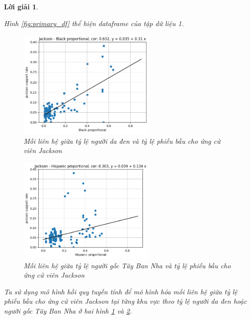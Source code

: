 \documentclass[14pt, a4paper]{article}
\theoremstyle{sltheorem}
\theoremstyle{soltheorem}
\newtheorem*{loigiai}{Lời giải}
\begin{document}
\begin{loigiai}
\begin{enumerate}
    Hình \ref{fig:primary_df} thể hiện dataframe của tập dữ liệu 1.

    \begin{figure}[H]
        \centering
        \includegraphics[width=0.6\textwidth]{figures/Jackson_support_rate-Black_proportional-Dataset_1.png}
        \caption{Mối liên hệ giữa tỷ lệ người da đen và tỷ lệ phiếu bầu cho ứng cử viên Jackson}
        \label{fig:Jackson_support_rate_Black_proportional_Dataset_1}
    \end{figure}

    \begin{figure}[H]
        \centering
        \includegraphics[width=0.6\textwidth]{figures/Jackson_support_rate-Hispanic_proportional-Dataset_1.png}
        \caption{Mối liên hệ giữa tỷ lệ người gốc Tây Ban Nha và tỷ lệ phiếu bầu cho ứng cử viên Jackson}
        \label{fig:Jackson_support_rate_Hispanic_proportional_Dataset_1}
    \end{figure}

    Ta sử dụng mô hình hồi quy tuyến tính để mô hình hóa mối liên hệ giữa tỷ lệ phiếu bầu cho ứng cử viên Jackson tại từng khu vực theo tỷ lệ người da đen hoặc người gốc Tây Ban Nha ở hai hình \ref{fig:Jackson_support_rate_Black_proportional_Dataset_1} và \ref{fig:Jackson_support_rate_Hispanic_proportional_Dataset_1}.


\end{enumerate}
\end{loigiai}
\end{document}
